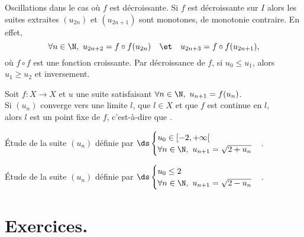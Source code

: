 \documentclass[11pt]{article}
\begin{document}
\begin{meth}{Oscillations dans le cas où $f$ est décroissante.}{}
    Si $f$ est décroissante sur $I$ alors les suites extraites $(u_{2n})$ et $(u_{2n+1})$ sont monotones, de monotonie contraire. En effet,
    \begin{equation*}
        \forall n \in \N, ~ u_{2n+2}=f\circ f(u_{2n}) \quad\et\quad u_{2n+3}=f\circ f(u_{2n+1}),
    \end{equation*}
    où $f\circ f$ est une fonction croissante. Par décroissance de $f$, si $u_0\leq u_1$, alors $u_1\geq u_2$ et inversement.
\end{meth}

\begin{prop}{}{}
    Soit $f:X\to X$ et $u$ une suite satisfaisant $\forall n \in \N, ~ u_{n+1}=f(u_n)$.\\
    Si $(u_n)$ converge vers une limite $l$, que $l\in X$ et que $f$ est continue en $l$,\\
    alors $l$ est un point fixe de $f$, c'est-à-dire que .
\end{prop}

\begin{ex}{}{}
    Étude de la suite $(u_n)$ définie par $\ds\begin{cases}u_0\in[-2,+\infty[\\\forall n \in \N, ~ u_{n+1}=\sqrt{2+u_n}\end{cases}$.
\end{ex}

\begin{ex}{}{}
    Étude de la suite $(u_n)$ définie par $\ds\begin{cases}u_0\leq 2\\\forall n \in \N, ~ u_{n+1}=\sqrt{2-u_n}\end{cases}$.
\end{ex}

\pagebreak

\section{Exercices.}
\end{document}
